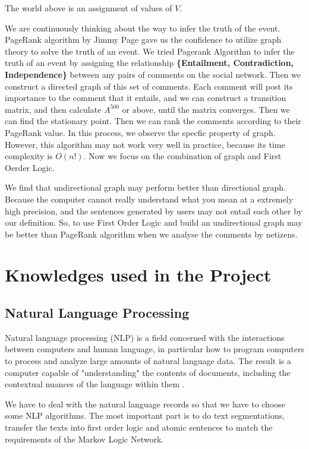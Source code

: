 \documentclass[
12pt, %
a4paper, %
oneside, %
headinclude,footinclude, %
BCOR5mm, %
]{scrartcl}
\begin{document}
The world above is an assignment of values of $V$.

We are continuously thinking about the way to infer the truth of the event. PageRank algorithm by Jimmy Page gave us the
confidence to utilize graph theory to solve the truth of an event. We tried Pagerank Algorithm to infer the truth of an
event by assigning the relationship \textbf{\{Entailment, Contradiction, Independence\}} between any pairs of comments on
the social network. Then we construct a directed graph of this set of comments. Each comment will post its importance to
the comment that it entails, and we can construct a transition matrix, and then calculate $A^500$ or above, until the matrix
converges. Then we can find the stationary point. Then we can rank the comments according to their PageRank value. In this process,
we observe the specfic property of graph. However, this algorithm may not work very well in practice, because its time complexity is $O(n!)$. 
Now we focus on the combination of graph and First Oerder Logic. 

We find that undirectional graph may perform better than directional graph. Because the computer cannot really understand what you mean at a extremely high
precision, and the sentences generated by users may not entail each other by our definition. So, to use First Order Logic and build an undirectional graph may be better than PageRank algorithm when we analyse the comments by netizens.







\section{Knowledges used in the Project}
\subsection{Natural Language Processing}
Natural language processing (NLP) is a field concerned with the interactions between computers and human language, in particular how to program computers to process and analyze large amounts of natural language data. The result is a computer capable of "understanding" the contents of documents, including the contextual nuances of the language within them \cite{enwiki:1020063620}.

We have to deal with the natural language records so that we have to choose some NLP algorithms. The most important part is to do text segmentations, transfer the texts into first order logic and atomic sentences to match the requirements of the Markov Logic Network.
\end{document}

